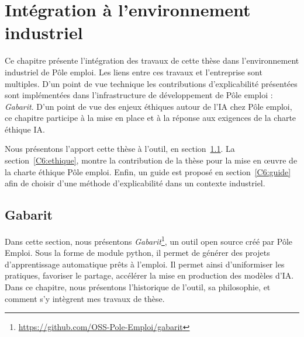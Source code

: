 
\chapter[Intégration à l'environnement industriel]{Intégration à l'environnement industriel}


Ce chapitre présente l'intégration des travaux de cette thèse dans l'environnement industriel de Pôle emploi.
Les liens entre ces travaux et l'entreprise sont multiples. D’un point de vue technique les contributions d’explicabilité présentées sont implémentées dans l'infrastructure de développement de Pôle emploi : \textit{Gabarit}. %
D’un point de vue des enjeux éthiques autour de l'IA chez Pôle emploi, ce chapitre participe à la mise en place et à la réponse aux exigences de la charte éthique IA.

Nous présentons l'apport cette thèse à l'outil, en section~\ref{C6:gabarit}. La section~\ref{C6:ethique}, montre la contribution de la thèse pour la mise en œuvre de la charte éthique Pôle emploi. Enfin, un guide est proposé en section~\ref{C6:guide} afin de choisir d'une méthode d'explicabilité dans un contexte industriel.

\section{Gabarit} \label{C6:gabarit}

Dans cette section, nous présentons \textit{Gabarit}\footnote{\url{https://github.com/OSS-Pole-Emploi/gabarit}}, un outil open source créé par Pôle Emploi. Sous la forme de module python, il permet de générer des projets d'apprentissage automatique prêts à l'emploi.
Il permet ainsi d'uniformiser les pratiques, favoriser le partage, accélérer la mise en production des modèles d'IA.
Dans ce chapitre, nous présentons l'historique de l'outil, sa philosophie, et comment s'y intègrent mes travaux de thèse.

